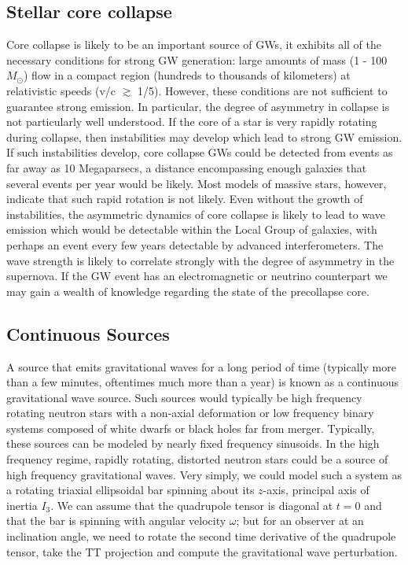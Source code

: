 \documentclass[binding=0.6cm, LaM]{sapthesis}
\begin{document}
\subsection{Stellar core collapse}
Core collapse is likely to be an important source of GWs, it exhibits all of the necessary conditions for strong GW generation: large amounts of mass (1 - 100 $M_{\odot}$) flow in a compact region
 (hundreds to thousands of kilometers) at relativistic speeds (v/c $\apprge$ 1/5). However, these conditions are not sufficient to guarantee strong emission.
In particular, the degree of asymmetry in collapse is not particularly well understood.
If the core of a star is very rapidly rotating during collapse, then instabilities may develop which lead to strong GW emission.
If such instabilities develop, core collapse GWs could be detected from events as far away as 10 Megaparsecs, a distance encompassing enough galaxies that several events per year would be likely.
Most models of massive stars, however, indicate that such rapid rotation is not likely.
Even without the growth of instabilities, the asymmetric dynamics of core collapse is likely to lead to wave emission which would be detectable within the Local Group of galaxies, with perhaps an
event every few years detectable by advanced interferometers.
The wave strength is likely to correlate strongly with the degree of asymmetry in the supernova.
If the GW event has an electromagnetic or neutrino counterpart we may gain a wealth of knowledge regarding the state of the precollapse core.

\subsection{Continuous Sources}
A source that emits gravitational waves for a long period of time (typically more than a few minutes, oftentimes much more than a year) is known as a continuous gravitational wave source. Such sources would typically be high frequency rotating neutron stars with a non-axial deformation or low frequency binary systems composed of white dwarfs or black holes far from merger. Typically, these sources can be modeled by nearly fixed frequency sinusoids.
In the high frequency regime, rapidly rotating, distorted neutron stars could be a source of high frequency gravitational waves. Very simply, we could model such a system as a rotating triaxial ellipsoidal bar spinning about its $z$-axis, principal axis of inertia $I_3$. We can assume that the quadrupole tensor is diagonal at $t = 0$ and that the bar is spinning with angular velocity $\omega$; but for an observer at an inclination angle, we need to rotate the second time derivative of the quadrupole tensor, take the TT projection and compute the gravitational wave perturbation.
\end{document}
